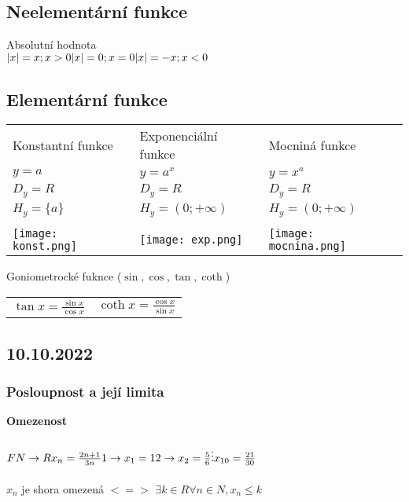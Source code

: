 \subsection*{Neelementární funkce}
Absolutní hodnota \\
\(
    \lvert x\rvert = x ; x > 0 \\
    \lvert x\rvert = 0 ; x = 0 \\
    \lvert x\rvert = -x ; x < 0
\)
    \subsection*{Elementární funkce}
\begin{tabular}{p{6cm} p{6cm} p{6cm}}
    Konstantní funkce & Exponenciální funkce & Mocniná funkce \\
    $y = a$ & $y = a^x$ & $y = x^a$ \\
    $D_y=R$ & $D_y = R$ & $D_y = R$ \\
    $H_y = \{a\}$ & $H_y = (0;+\infty)$ & $H_y = (0;+\infty)$ \\ \\
    \texttt{[image: konst.png]}&
    \texttt{[image: exp.png]}&
    \texttt{[image: mocnina.png]} \\

\end{tabular}

Goniometrocké fuknce
($\sin{},\cos{},\tan{}, \coth{}$)
 
\begin{center}
    \begin{tabular}{p{5cm} p{5cm}}
        \(\tan{x}=\frac{\sin{x}}{\cos{x}} \)&
        \(\coth{x}=\frac{\cos{x}}{\sin{x}} \) \\
    \end{tabular}
\end{center}
\page
\subsection*{10.10.2022}
\subsubsection*{Posloupnost a její limita}

\textbf{Omezenost}
\\\\
\begin{math}
    F N \rightarrow R
    \\ x_n = \frac{2n + 1}{3n}
    \\ 1 \rightarrow x_1 = 1
    \\ 2 \rightarrow x_2 = \frac{5}{6}
    \\\vdots
    \\ x_{10} = \frac{21}{30}
\end{math}
\\\\
$x_n$ je shora omezená  $<=>$ $\exists k \in R \forall n \in N , x_n \leqslant k$

